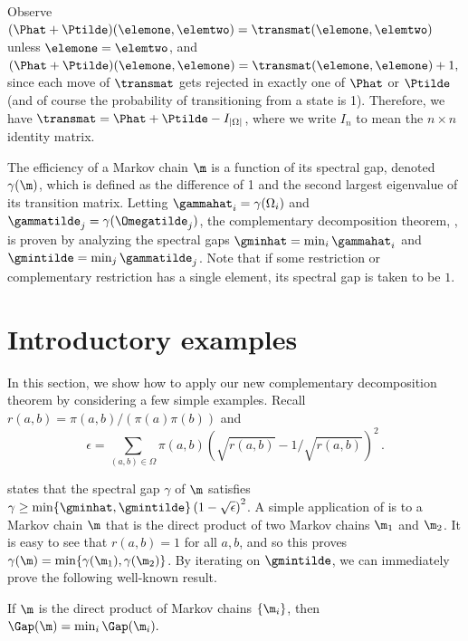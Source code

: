 \documentclass{toc}
\begin{document}
Observe $(\Phat+\Ptilde)(\elemone,\elemtwo)=\transmat(\elemone,\elemtwo)$ 
unless $\elemone=\elemtwo$, and 
$(\Phat+\Ptilde)(\elemone,\elemone)=\transmat(\elemone,\elemone)+1,$ 
since each move of $\transmat$ gets rejected in exactly one of $\Phat$ 
or $\Ptilde$ (and of course the probability of transitioning from a 
state is 1).  Therefore, we have $\transmat = 
\Phat+\Ptilde-I_{|\Omega|}$, where we write $I_n$ to 
mean the $n \times n$ identity matrix. 

The efficiency of a Markov chain $\m$ is a function of its spectral 
gap, denoted $\gamma(\m)$, which is defined as the difference of 1 and 
the second largest eigenvalue of its transition matrix. Letting 
$\gammahat_i = \gamma(\Omega_i)$ and $\gammatilde_j = 
\gamma(\Omegatilde_j)$, the complementary decomposition theorem, 
, is proven by analyzing the spectral 
gaps $\gminhat=\min_i \gammahat_i$ and $\gmintilde=\min_j 
\gammatilde_j$.  Note that if some restriction or complementary 
restriction has a single element, its spectral gap is taken to be $1$.

\section{Introductory examples}\label{sec:decompThm} 

In this section, we show how to apply our new complementary
decomposition theorem by considering a few simple examples.  Recall
$r(a,b) = \pi(a,b)/(\pi(a)\pi(b))$ and
\vspace{-.1in}
\[\epsilon = \sum_{(a,b)\in\Omega}\pi(a,b)\left(\sqrt{r(a,b)} -
1/\sqrt{r(a,b)}\right)^2\,.\]

\vspace{-.15in}

\noindent {} states that the spectral gap 
$\gamma$ of $\m$ satisfies $\gamma \geq \min\{\gminhat, 
\gmintilde\}\left(1 -\sqrt{\epsilon}\right)^2$. 
A simple application of  is to a Markov 
chain $\m$ that is the direct product of two Markov chains $\m_1$ and $ 
\m_2$.  It is easy to see that $r(a,b)=1$ for all $a,b$, and so this proves
$\gamma(\m) = \min\{\gamma(\m_1), \gamma(\m_2)\}$.  By 
iterating on $\gmintilde$, we can immediately prove the following well-known result. 

\begin{corollary}\label{cor:product}
If $\m$ is the direct product of Markov chains $\{\m_i\}$,
then  $\Gap(\m)=\min_i\Gap(\m_i).$
\end{corollary}
\end{document}
